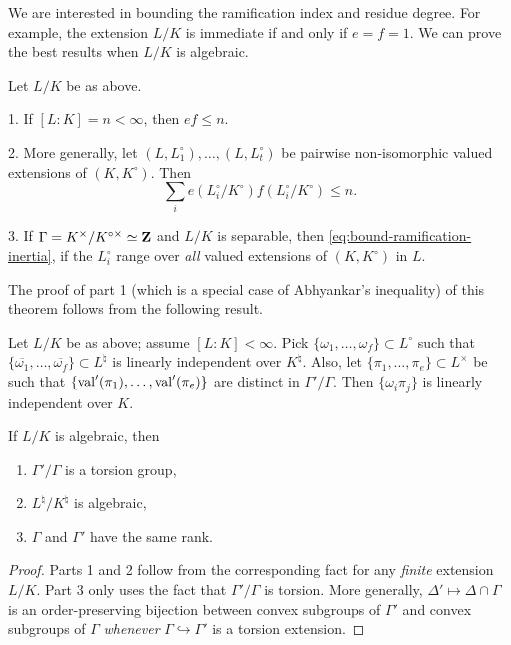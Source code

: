 We are interested in bounding the ramification index and residue degree. 
For example, the extension $L/K$ is immediate if and only if $e=f=1$. We can 
prove the best results when $L/K$ is algebraic. 

\begin{theorem}\label{thm:efn}
Let $L/K$ be as above. 

1. If $[L\colon K]=n<\infty$, then $e f\leqslant n$. 

2. More generally, let $(L,L_1^\circ),\dots,(L,L_t^\circ)$ be pairwise 
non-isomorphic valued extensions of $(K,K^\circ)$. Then 
\begin{equation}\label{eq:bound-ramification-inertia}
  \sum_i e(L_i^\circ/K^\circ) f(L_i^\circ/K^\circ) \leqslant n .
\end{equation}

3. If $\Gamma=K^\times/K^{\circ\times}\simeq \mathbf{Z}$ and $L/K$ is separable, then 
\eqref{eq:bound-ramification-inertia}, if the $L_i^\circ$ range over 
\emph{all} valued extensions of $(K,K^\circ)$ in $L$. 
\end{theorem}

The proof of part 1 (which is a special case of Abhyankar's inequality) of 
this theorem follows from the following result. 

\begin{lemma}
Let $L/K$ be as above; assume $[L\colon K]<\infty$. Pick 
$\{\omega_1,\dots,\omega_f\}\subset L^\circ$ such that 
$\{\overline{\omega_1},\dots,\overline{\omega_f}\}\subset L^\natural$ is 
linearly independent over $K^\natural$. Also, let 
$\{\pi_1,\dots,\pi_e\}\subset L^\times$ be such that 
$\{\operatorname{val}'(\pi_1),\dots,\operatorname{val}'(\pi_e)\}$ are distinct in 
$\Gamma'/\Gamma$. Then $\{\omega_i \pi_j\}$ is linearly independent over $K$. 
\end{lemma}

\begin{corollary}
If $L/K$ is algebraic, then 
\begin{enumerate}
\item
$\Gamma'/\Gamma$ is a torsion group, 

\item
$L^\natural/K^\natural$ is algebraic, 

\item
$\Gamma$ and $\Gamma'$ have the same rank. 
\end{enumerate}
\end{corollary}
\begin{proof}
Parts 1 and 2 follow from the corresponding fact for any \emph{finite} 
extension $L/K$. Part 3 only uses the fact that $\Gamma'/\Gamma$ is torsion. 
More generally, $\Delta'\mapsto \Delta\cap \Gamma$ is an order-preserving 
bijection between convex subgroups of $\Gamma'$ and convex subgroups of 
$\Gamma$ \emph{whenever} $\Gamma\hookrightarrow \Gamma'$ is a torsion 
extension. 
\end{proof}

